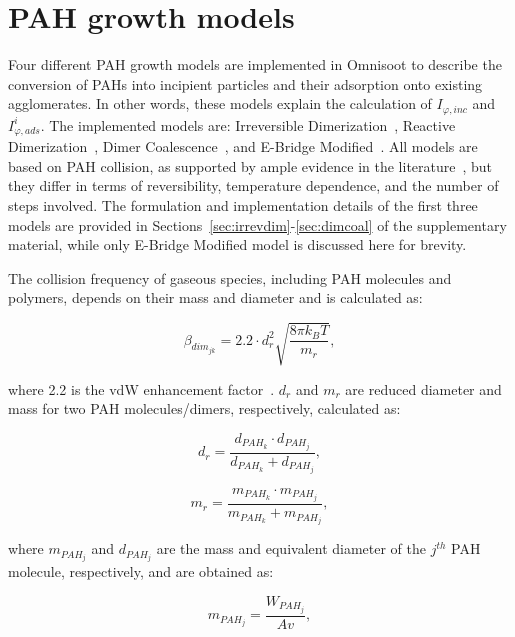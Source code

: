 \section{PAH growth models}
\label{sec:pahgrowmodel}
Four different PAH growth models are implemented in Omnisoot to describe the conversion of PAHs into incipient particles and their adsorption onto existing agglomerates. In other words, these models explain the calculation of $I_{\varphi, inc}$ and $I^i_{\varphi, ads}$. The implemented models are: Irreversible Dimerization~\cite{frenklach1991detailed}, Reactive Dimerization~\citep{kholghy2018reactive}, Dimer Coalescence~\citep{blanquart2009joint}, and E-Bridge Modified~\citep{frenklach2020mechanism}. All models are based on PAH collision, as supported by ample evidence in the literature~\citep{zhao2003measurement, abid2009quantitative, happold2009soot}, but they differ in terms of reversibility, temperature dependence, and the number of steps involved. The formulation and implementation details of the first three models are provided in Sections~\ref{sec:irrevdim}-\ref{sec:dimcoal} of the supplementary material, while only E-Bridge Modified model is discussed here for brevity.

The collision frequency of gaseous species, including PAH molecules and polymers, depends on their mass and diameter and is calculated as:

\begin{equation}
	\beta_{dim_{jk}}=
	2.2 \cdot d^2_{r} \sqrt{\frac{8 \pi k_B T}{m_{r}}},
	\label{eqn:betadim}
\end{equation}

\noindent where 2.2 is the vdW enhancement factor~\citep{kholghy2018reactive}. ${d_{r}}$ and ${m_{r}}$ are reduced diameter and mass for two PAH molecules/dimers, respectively, calculated as:

\begin{equation}
	d_{r}=
	\frac{d_{{PAH}_k}\cdot d_{{PAH}_j}}{d_{{PAH}_k}+d_{{PAH}_j}},
	\label{eqn:drPAH}
\end{equation}

\begin{equation}
	m_{r}=
		\frac{m_{{PAH}_k}\cdot m_{{PAH}_j}}{m_{{PAH}_k}+ m_{{PAH}_j}},
	\label{eqn:mrPAH}
\end{equation}

\noindent where $m_{PAH_j}$ and $d_{PAH_j}$ are the mass and equivalent diameter of the ${j}^{th}$ PAH molecule, respectively, and are obtained as:

\begin{equation}
	m_{PAH_j}=
	\frac{W_{{PAH}_j}}{Av},
	\label{eqn:mPAH}
\end{equation}

